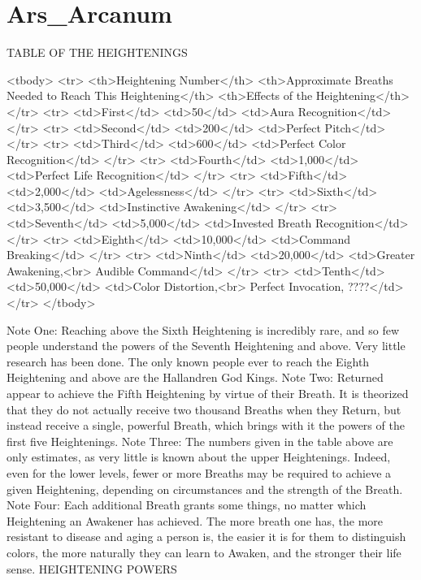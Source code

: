 \section{Ars_Arcanum}

TABLE OF THE HEIGHTENINGS

<tbody>
<tr>
<th>Heightening Number</th>
<th>Approximate Breaths Needed to Reach This Heightening</th>
<th>Effects of the Heightening</th>
</tr>
<tr>
<td>First</td>
<td>50</td>
<td>Aura Recognition</td>
</tr>
<tr>
<td>Second</td>
<td>200</td>
<td>Perfect Pitch</td>
</tr>
<tr>
<td>Third</td>
<td>600</td>
<td>Perfect Color Recognition</td>
</tr>
<tr>
<td>Fourth</td>
<td>1,000</td>
<td>Perfect Life Recognition</td>
</tr>
<tr>
<td>Fifth</td>
<td>2,000</td>
<td>Agelessness</td>
</tr>
<tr>
<td>Sixth</td>
<td>3,500</td>
<td>Instinctive Awakening</td>
</tr>
<tr>
<td>Seventh</td>
<td>5,000</td>
<td>Invested Breath Recognition</td>
</tr>
<tr>
<td>Eighth</td>
<td>10,000</td>
<td>Command Breaking</td>
</tr>
<tr>
<td>Ninth</td>
<td>20,000</td>
<td>Greater Awakening,<br>
Audible Command</td>
</tr>
<tr>
<td>Tenth</td>
<td>50,000</td>
<td>Color Distortion,<br>
Perfect Invocation, ????</td>
</tr>
</tbody>

Note One: Reaching above the Sixth Heightening is incredibly rare, and so few people understand the powers of the Seventh Heightening and above. Very little research has been done. The only known people ever to reach the Eighth Heightening and above are the Hallandren God Kings.
Note Two: Returned appear to achieve the Fifth Heightening by virtue of their Breath. It is theorized that they do not actually receive two thousand Breaths when they Return, but instead receive a single, powerful Breath, which brings with it the powers of the first five Heightenings.
Note Three: The numbers given in the table above are only estimates, as very little is known about the upper Heightenings. Indeed, even for the lower levels, fewer or more Breaths may be required to achieve a given Heightening, depending on circumstances and the strength of the Breath.
Note Four: Each additional Breath grants some things, no matter which Heightening an Awakener has achieved. The more breath one has, the more resistant to disease and aging a person is, the easier it is for them to distinguish colors, the more naturally they can learn to Awaken, and the stronger their life sense.
HEIGHTENING POWERS

